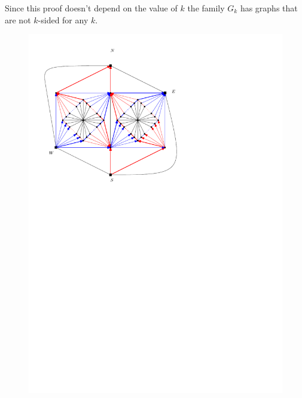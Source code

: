   Since this proof doesn't depend on the value of $k$ the family $G_k$ has graphs that are not $k$-sided for any $k$.

  \begin{figure}[h]
    \centering
    \includegraphics[scale=1]{fixExtension/img/manymany4}
    \caption{}
    \label{fig:fix:manymany4}
  \end{figure}
